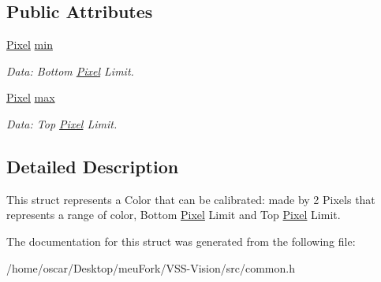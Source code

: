 \subsection*{Public Attributes}
\begin{DoxyCompactItemize}
\item 
\hypertarget{structcommon_1_1VisionColor_a3a8a40c24233df23f44510fce5846aaf}{\hyperlink{structcommon_1_1Pixel}{Pixel} \hyperlink{structcommon_1_1VisionColor_a3a8a40c24233df23f44510fce5846aaf}{min}}\label{structcommon_1_1VisionColor_a3a8a40c24233df23f44510fce5846aaf}

\begin{DoxyCompactList}\small\item\em Data\-: Bottom \hyperlink{structcommon_1_1Pixel}{Pixel} Limit. \end{DoxyCompactList}\item 
\hypertarget{structcommon_1_1VisionColor_adc2c9c3c09c9694f7ce8e9c8d94407bd}{\hyperlink{structcommon_1_1Pixel}{Pixel} \hyperlink{structcommon_1_1VisionColor_adc2c9c3c09c9694f7ce8e9c8d94407bd}{max}}\label{structcommon_1_1VisionColor_adc2c9c3c09c9694f7ce8e9c8d94407bd}

\begin{DoxyCompactList}\small\item\em Data\-: Top \hyperlink{structcommon_1_1Pixel}{Pixel} Limit. \end{DoxyCompactList}\end{DoxyCompactItemize}


\subsection{Detailed Description}
This struct represents a Color that can be calibrated\-: made by 2 Pixels that represents a range of color, Bottom \hyperlink{structcommon_1_1Pixel}{Pixel} Limit and Top \hyperlink{structcommon_1_1Pixel}{Pixel} Limit. 

The documentation for this struct was generated from the following file\-:\begin{DoxyCompactItemize}
\item 
/home/oscar/\-Desktop/meu\-Fork/\-V\-S\-S-\/\-Vision/src/common.\-h\end{DoxyCompactItemize}
